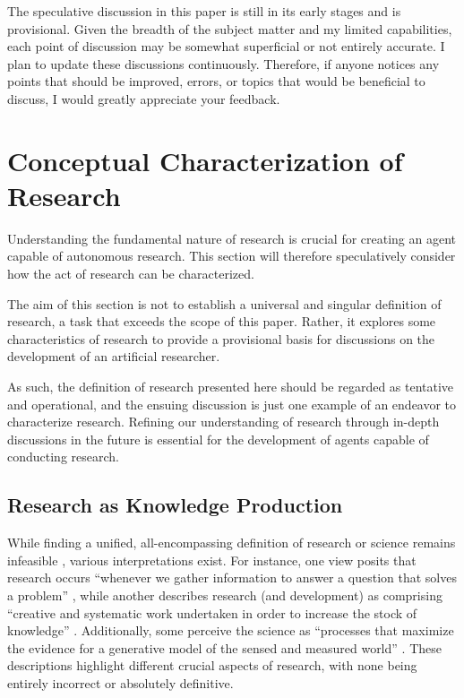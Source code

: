 \documentclass{article}
\begin{document}
The speculative discussion in this paper is still in its early stages and is provisional. Given the breadth of the subject matter and my limited capabilities, each point of discussion may be somewhat superficial or not entirely accurate. I plan to update these discussions continuously. Therefore, if anyone notices any points that should be improved, errors, or topics that would be beneficial to discuss, I would greatly appreciate your feedback.


\section{Conceptual Characterization of Research}
\label{section-what-is-research}

Understanding the fundamental nature of research is crucial for creating an agent capable of autonomous research. This section will therefore speculatively consider how the act of research can be characterized.

The aim of this section is not to establish a universal and singular definition of research, a task that exceeds the scope of this paper. Rather, it explores some characteristics of research to provide a provisional basis for discussions on the development of an artificial researcher. 

As such, the definition of research presented here should be regarded as tentative and operational, and the ensuing discussion is just one example of an endeavor to characterize research. Refining our understanding of research through in-depth discussions in the future is essential for the development of agents capable of conducting research. 

\subsection{Research as Knowledge Production}

While finding a unified, all-encompassing definition of research or science remains infeasible \cite{chalmers2013thing,sep-scientific-method}, various interpretations exist. For instance, one view posits that research occurs ``whenever we gather information to answer a question that solves a problem'' \cite{booth2003craft}, while another describes research (and development) as comprising ``creative and systematic work undertaken in order to increase the stock of knowledge'' \cite{manual2015guidelines}. Additionally, some perceive the science as ``processes that maximize the evidence for a generative model of the sensed and measured world'' \cite{balzandistributed}. These descriptions highlight different crucial aspects of research, with none being entirely incorrect or absolutely definitive.
\end{document}
